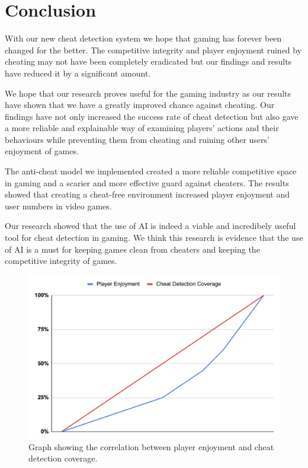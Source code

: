 \section{Conclusion}
\label{ch:conclusion}

With our new cheat detection system we hope that gaming has forever been changed for the better. The competitive integrity and player enjoyment ruined by cheating may not have been completely eradicated but our findings and results have reduced it by a significant amount. 

We hope that our research proves useful for the gaming industry as our results have shown that we have a greatly improved chance against cheating. Our findings have not only increased the success rate of cheat detection but also gave a more reliable and explainable way of examining players' actions and their behaviours while preventing them from cheating and ruining other users' enjoyment of games.

The anti-cheat model we implemented created a more reliable competitive space in gaming and a scarier and more effective guard against cheaters. The results showed that creating a cheat-free environment increased player enjoyment and user numbers in video games.

Our research showed that the use of AI is indeed a viable and incredibely useful tool for cheat detection in gaming. We think this research is evidence that the use of AI is a must for keeping games clean from cheaters and keeping the competitive integrity of games.

\begin{figure}[h]
\centering
\includegraphics[width=0.6\linewidth]{images/enjoyment.jpeg}
\captionsetup{width=0.6\textwidth}
\caption{\label{fig:enjoyment}Graph showing the correlation between player enjoyment and cheat detection coverage.}
\end{figure}